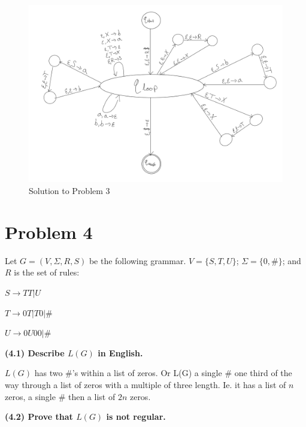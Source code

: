 \documentclass[11pt]{article}
\begin{document}
\begin{figure}[h!]
\includegraphics[scale=1]{problem3.png} 
\caption{Solution to Problem 3}
\end{figure}



\newpage
\section*{Problem 4}

\noindent
Let $G=(V,\Sigma,R,S)$ be the following grammar. $V=\{S,T,U\}$;
$\Sigma=\{0,\#\}$; and $R$ is the set of rules:

$S\rightarrow TT|U$

$T\rightarrow 0T|T0|\#$

$U\rightarrow 0U00|\#$

\noindent
\textbf{(4.1) Describe $L(G)$ in English.}
\newline

$L(G)$ has two $\#$'s within a list of zeros. Or L(G) a single $\#$ one third of the way through a list of zeros with a multiple of three length. Ie. it has a list of $n$ zeros, a single $\#$ then a list of $2n$ zeros.

\noindent
\textbf{(4.2) Prove that $L(G)$ is not regular.}
\end{document}
